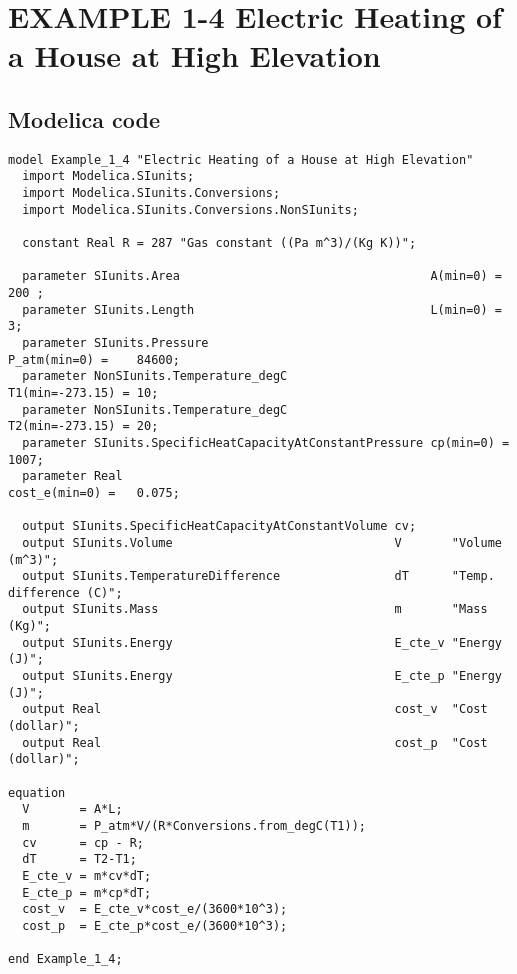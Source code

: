 \documentclass{modelica}
\begin{document}
\thispagestyle{empty}
\date{} %

\section*{EXAMPLE 1-4 Electric Heating of a House at High Elevation}

\subsection*{Modelica code}


\begin{lstlisting}[mathescape=true] 
model Example_1_4 "Electric Heating of a House at High Elevation"
  import Modelica.SIunits;
  import Modelica.SIunits.Conversions;
  import Modelica.SIunits.Conversions.NonSIunits;

  constant Real R = 287 "Gas constant ((Pa m^3)/(Kg K))";

  parameter SIunits.Area                                   A(min=0) =        200 ;
  parameter SIunits.Length                                 L(min=0) =        3;
  parameter SIunits.Pressure                               P_atm(min=0) =    84600;
  parameter NonSIunits.Temperature_degC                    T1(min=-273.15) = 10;
  parameter NonSIunits.Temperature_degC                    T2(min=-273.15) = 20;
  parameter SIunits.SpecificHeatCapacityAtConstantPressure cp(min=0) =       1007;
  parameter Real                                           cost_e(min=0) =   0.075;

  output SIunits.SpecificHeatCapacityAtConstantVolume cv;
  output SIunits.Volume                               V       "Volume (m^3)";
  output SIunits.TemperatureDifference                dT      "Temp. difference (C)";
  output SIunits.Mass                                 m       "Mass (Kg)";
  output SIunits.Energy                               E_cte_v "Energy (J)";
  output SIunits.Energy                               E_cte_p "Energy (J)";
  output Real                                         cost_v  "Cost (dollar)";
  output Real                                         cost_p  "Cost (dollar)";

equation 
  V       = A*L;
  m       = P_atm*V/(R*Conversions.from_degC(T1));
  cv      = cp - R;
  dT      = T2-T1;
  E_cte_v = m*cv*dT;
  E_cte_p = m*cp*dT;
  cost_v  = E_cte_v*cost_e/(3600*10^3);
  cost_p  = E_cte_p*cost_e/(3600*10^3);
  
end Example_1_4;  
\end{lstlisting}
\end{document}
